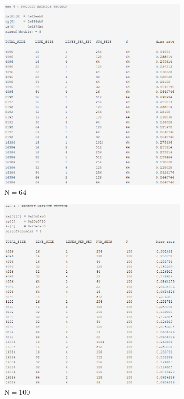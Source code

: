 \documentclass[12pt]{base}
\begin{document}
\begin{figure}[H]
\begin{subfigure}[H]{0.5\linewidth}
    \centering
    \includegraphics[width=0.75\linewidth]{2_vect_64.png}
    \caption{$\text{N}=64$}
    \label{fig:2_64}
\end{subfigure}
\begin{subfigure}[H]{0.5\linewidth}
    \centering
    \includegraphics[width=0.75\linewidth]{2_vect_100.png}
    \caption{$\text{N}=100$}
    \label{fig:2_100}
\end{subfigure}\par\bigskip
\begin{subfigure}[H]{0.5\linewidth}

\end{subfigure}
\end{figure}
\end{document}
